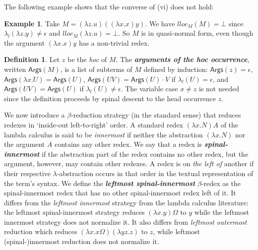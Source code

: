 \documentclass[xchauthor,chkrefs,GCNS,amsmath,amsthm,rotating,leaveRGB]{tcsg}
\renewcommand{\index}[1]{}
\theoremstyle{plain}
\theoremstyle{definition}
\newtheorem{definition}{Definition}[section]
\newtheorem{example}{Example}[section]
\begin{document}
The following example shows that the converse of (vi) does not hold:

\begin{example}
Take $M= (\lambda z.u)((\lambda x . x) y)$. We have $lloc_{M}(M) = \bot $
since $\lambda _{l}(\lambda z.y)\ne \epsilon $ and $lloc_{M}(\lambda z.u) =
\bot $. So $M$ is in quasi-normal form, even though the argument $(\lambda x
. x) y$ has a non-trivial redex.
\end{example}

\begin{definition}
Let $z$ be the \emph{hoc} of $M$. The \textbf{\emph{arguments of the \emph
{hoc} occurrence}}\index{arguments of the \emph {hoc} occurrence}, written
$\mathsf{Args}(M)$, is a list of subterms of $M$ defined by induction:
$\mathsf{Args}(z) = \epsilon $, $\mathsf{Args}(\lambda x . U ) =
\mathsf{Args}(U)$, $\mathsf{Args}(U V) = \mathsf{Args}(U) \cdot V$  if
$\lambda _{l}(U) = \epsilon $, and $\mathsf{Args}(U V) = \mathsf{Args}(U)$ if
$\lambda _{l}(U) \neq \epsilon $. The variable case $x\neq z$ is not needed
since the definition proceeds by spinal descent to the head occurrence $z$.
\end{definition}

We now introduce a $\beta $-reduction strategy (in the standard sense) that
reduces redexes in `inside-out left-to-right' order. A standard redex
$(\lambda x . N) A$ of the lambda calculus is said to be \emph{innermost} if
neither the abstraction $(\lambda x . N)$ nor the argument $A$  contains any
other redex. We say that a redex is
\textbf{\emph{spinal-innermost}}\index{spinal-innermost} if the abstraction
part of the redex contains no other redex, but the argument, however, may contain other redexes. A redex is on \emph{the left of} another if
their respective $\lambda $-abstraction occurs in that order in the textual
representation of the term's syntax. We define the \textbf{\emph{leftmost
spinal-innermost}}\index{leftmost spinal-innermost} $\beta $-redex as the
spinal-innermost redex that has no other spinal-innermost redex left of it.
It differs from the \emph{leftmost innermost} strategy from the lambda
calculus literature: the leftmost spinal-innermost strategy reduces $(\lambda
x . y) \Omega $ to $y$ while the leftmost innermost strategy does not
normalize it. It also differs from \emph{leftmost outermost} reduction which
reduces $(\lambda x . x \Omega )(\lambda y z . z)$ to $z$, while leftmost
(spinal-)innermost reduction does not normalize it.
\end{document}
